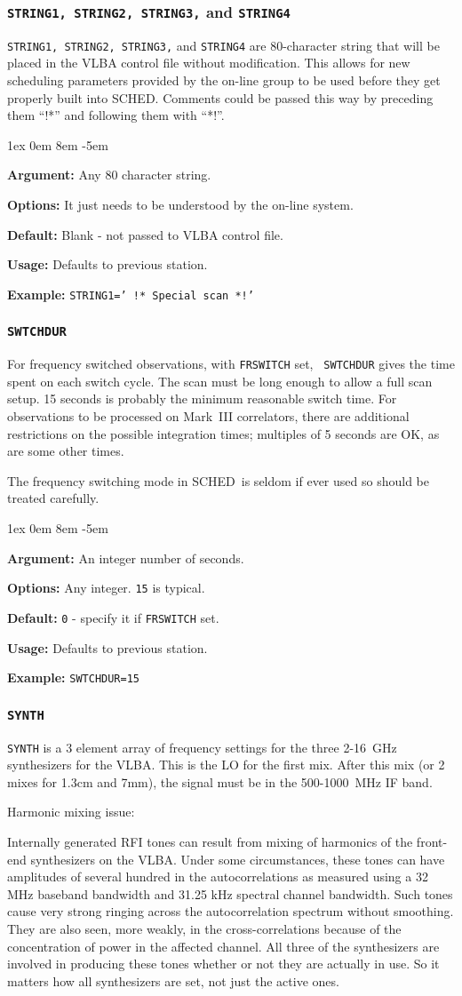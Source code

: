 \documentclass{report}
\newcommand{\schedb}{{\sc SCHED~}}
\newcommand{\rcwbox}[5]{
  \begin{list}{}{\parsep 1ex  \itemsep 0em
                 \leftmargin 8em  \itemindent -5em }
    \item {\bf Argument:} #1
    \item {\bf Options:}  #2
    \item {\bf Default:}  #3
    \item {\bf Usage:}    #4
    \item {\bf Example:}  #5
  \end{list}
}
\begin{document}
\subsubsection{\label{SP:STRING1}
{\tt STRING1, STRING2, STRING3,} and {\tt STRING4}}

{\tt STRING1, STRING2, STRING3,} and {\tt STRING4} are 80-character
string that will be placed in the VLBA control file without
modification. This allows for new scheduling parameters provided by
the on-line group to be used before they get properly built into {\sc
SCHED}. Comments could be passed this way by preceding them ``!*''
and following them with ``*!''.

\rcwbox
{Any 80 character string.}
{It just needs to be understood by the on-line system.}
{Blank - not passed to VLBA control file.}
{Defaults to previous station.}
{{\tt STRING1=' !*  Special scan  *!'}}


\subsubsection{\label{SP:SWTCHDUR}{\tt SWTCHDUR}}

For frequency switched observations, with {\tt FRSWITCH} set, {\tt
SWTCHDUR} gives the time spent on each switch cycle.  The scan must be
long enough to allow a full scan setup.  15 seconds is probably the
minimum reasonable switch time.  For observations to be processed on
Mark~III correlators, there are additional restrictions on the
possible integration times; multiples of 5 seconds are OK, as are some
other times.

The frequency switching mode in \schedb is seldom if ever used so
should be treated carefully.

\rcwbox
{An integer number of seconds.}
{Any integer. {\tt 15} is typical.}
{{\tt 0} - specify it if {\tt FRSWITCH} set.}
{Defaults to previous station.}
{{\tt SWTCHDUR=15}}


\subsubsection{\label{SP:SYNTH}{\tt SYNTH}}

{\tt SYNTH} is a 3 element array of frequency settings for the three
2-16~GHz synthesizers for the VLBA. This is the LO for the first
mix. After this mix (or 2 mixes for 1.3cm and 7mm), the signal must be
in the 500-1000~MHz IF band.

Harmonic mixing issue:

Internally generated RFI tones can result from mixing of harmonics of
the front-end synthesizers on the VLBA.  Under some circumstances,
these tones can have amplitudes of several hundred in the
autocorrelations as measured using a 32 MHz baseband bandwidth and
31.25 kHz spectral channel bandwidth.  Such tones cause very strong
ringing across the autocorrelation spectrum without smoothing.  They
are also seen, more weakly, in the cross-correlations because of the
concentration of power in the affected channel.  All three of the
synthesizers are involved in producing these tones whether or not they
are actually in use.  So it matters how all synthesizers are set, not
just the active ones.
\end{document}
